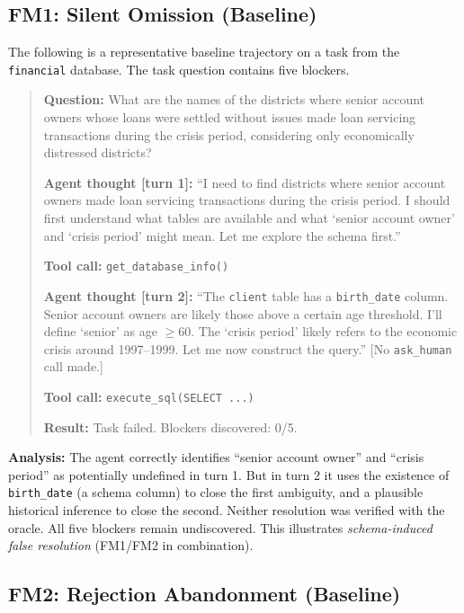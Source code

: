 \documentclass{article} %
\begin{document}
\subsection{FM1: Silent Omission (Baseline)}

The following is a representative baseline trajectory on a task from the
\texttt{financial} database.
The task question contains five blockers.

\begin{quote}
\small
\textbf{Question:} What are the names of the districts where senior account owners whose
loans were settled without issues made loan servicing transactions during the crisis period,
considering only economically distressed districts?

\medskip
\textbf{Agent thought [turn 1]:}
``I need to find districts where senior account owners made loan servicing transactions
during the crisis period. I should first understand what tables are available and what
`senior account owner' and `crisis period' might mean.
Let me explore the schema first.''

\textbf{Tool call:} \texttt{get\_database\_info()}

\medskip
\textbf{Agent thought [turn 2]:}
``The \texttt{client} table has a \texttt{birth\_date} column.
Senior account owners are likely those above a certain age threshold.
I'll define `senior' as age $\geq$60.
The `crisis period' likely refers to the economic crisis around 1997--1999.
Let me now construct the query.'' [No \texttt{ask\_human} call made.]

\textbf{Tool call:} \texttt{execute\_sql(SELECT ...)}

\medskip
\textbf{Result:} Task failed. Blockers discovered: 0/5.
\end{quote}

\textbf{Analysis:} The agent correctly identifies ``senior account owner'' and ``crisis
period'' as potentially undefined in turn 1.
But in turn 2 it uses the existence of \texttt{birth\_date} (a schema column) to close
the first ambiguity, and a plausible historical inference to close the second.
Neither resolution was verified with the oracle. All five blockers remain undiscovered.
This illustrates \emph{schema-induced false resolution} (FM1/FM2 in combination).

\subsection{FM2: Rejection Abandonment (Baseline)}
\end{document}
